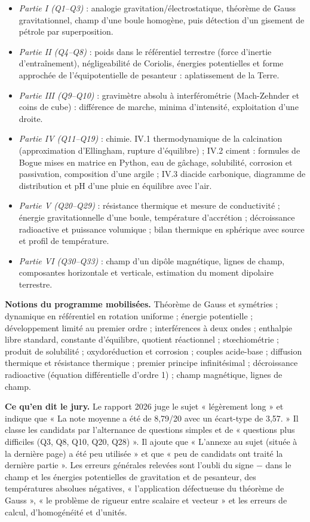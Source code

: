 \documentclass[11pt,a4paper]{article}
\providecommand{\tightlist}{\setlength{\itemsep}{0pt}\setlength{\parskip}{0pt}}
\begin{document}
\begin{itemize}
\tightlist
\item
  \emph{Partie I (Q1--Q3)} : analogie gravitation/électrostatique, théorème de Gauss gravitationnel, champ d'une boule homogène, puis détection d'un gisement de pétrole par superposition.
\item
  \emph{Partie II (Q4--Q8)} : poids dans le référentiel terrestre (force d'inertie d'entraînement), négligeabilité de Coriolis, énergies potentielles et forme approchée de l'équipotentielle de pesanteur : aplatissement de la Terre.
\item
  \emph{Partie III (Q9--Q10)} : gravimètre absolu à interférométrie (Mach-Zehnder et coins de cube) : différence de marche, minima d'intensité, exploitation d'une droite.
\item
  \emph{Partie IV (Q11--Q19)} : chimie. IV.1 thermodynamique de la calcination (approximation d'Ellingham, rupture d'équilibre) ; IV.2 ciment : formules de Bogue mises en matrice en Python, eau de gâchage, solubilité, corrosion et passivation, composition d'une argile ; IV.3 diacide carbonique, diagramme de distribution et pH d'une pluie en équilibre avec l'air.
\item
  \emph{Partie V (Q20--Q29)} : résistance thermique et mesure de conductivité ; énergie gravitationnelle d'une boule, température d'accrétion ; décroissance radioactive et puissance volumique ; bilan thermique en sphérique avec source et profil de température.
\item
  \emph{Partie VI (Q30--Q33)} : champ d'un dipôle magnétique, lignes de champ, composantes horizontale et verticale, estimation du moment dipolaire terrestre.
\end{itemize}

\textbf{Notions du programme mobilisées.} Théorème de Gauss et symétries ; dynamique en référentiel en rotation uniforme ; énergie potentielle ; développement limité au premier ordre ; interférences à deux ondes ; enthalpie libre standard, constante d'équilibre, quotient réactionnel ; stœchiométrie ; produit de solubilité ; oxydoréduction et corrosion ; couples acide-base ; diffusion thermique et résistance thermique ; premier principe infinitésimal ; décroissance radioactive (équation différentielle d'ordre 1) ; champ magnétique, lignes de champ.

\textbf{Ce qu'en dit le jury.} Le rapport 2026 juge le sujet « légèrement long » et indique que « La note moyenne a été de 8,79/20 avec un écart-type de 3,57. » Il classe les candidats par l'alternance de questions simples et de « questions plus difficiles (Q3, Q8, Q10, Q20, Q28) ». Il ajoute que « L'annexe au sujet (située à la dernière page) a été peu utilisée » et que « peu de candidats ont traité la dernière partie ». Les erreurs générales relevées sont l'oubli du signe \(-\) dans le champ et les énergies potentielles de gravitation et de pesanteur, des températures absolues négatives, « l'application défectueuse du théorème de Gauss », « le problème de rigueur entre scalaire et vecteur » et les erreurs de calcul, d'homogénéité et d'unités.
\end{document}
